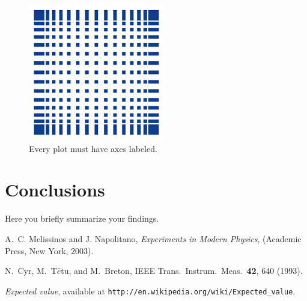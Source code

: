 \documentclass[letterpaper,12pt]{article}
\begin{document}
	\begin{figure}[ht] 
		\centering
		\includegraphics[width=0.5\columnwidth]{Images/hsMannheim.jpg}
		
		\caption{
			\label{fig:exp_plots}  
			Every plot must have axes labeled.
		}
	\end{figure}
	
	
	\section{Conclusions}
	Here you briefly summarize your findings.
	
	
	\begin{thebibliography}{99}
		
		A.~C. Melissinos and J. Napolitano, \textit{Experiments in Modern Physics},
		(Academic Press, New York, 2003).
		
		N.\ Cyr, M.\ T$\hat{e}$tu, and M.\ Breton,
		IEEE Trans.\ Instrum.\ Meas.\ \textbf{42}, 640 (1993).
		
		 \emph{Expected value},  available at
		\texttt{http://en.wikipedia.org/wiki/Expected\_value}.
		
	\end{thebibliography}
	
	
\end{document}
